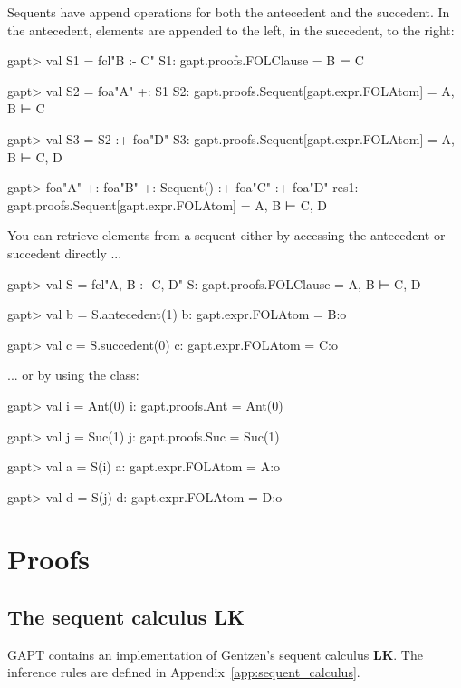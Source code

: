 \documentclass[a4paper,11pt]{book}
\newcommand{\LK}{\textbf{LK}}
\newcommand{\cli}[1]{{\ttfamily {#1}}}
\begin{document}
Sequents have append operations for both the antecedent and the succedent. In the antecedent,
elements are appended to the left, in the succedent, to the right:

\begin{clilisting}
gapt> val S1 = fcl"B :- C"
S1: gapt.proofs.FOLClause = B ⊢ C

gapt> val S2 = foa"A" +: S1
S2: gapt.proofs.Sequent[gapt.expr.FOLAtom] = A, B ⊢ C

gapt> val S3 = S2 :+ foa"D"
S3: gapt.proofs.Sequent[gapt.expr.FOLAtom] = A, B ⊢ C, D

gapt> foa"A" +: foa"B" +: Sequent() :+ foa"C" :+ foa"D"
res1: gapt.proofs.Sequent[gapt.expr.FOLAtom] = A, B ⊢ C, D

\end{clilisting}

You can retrieve elements from a sequent either by accessing the antecedent
or succedent directly ...
\begin{clilisting}
gapt> val S = fcl"A, B :- C, D"
S: gapt.proofs.FOLClause = A, B ⊢ C, D

gapt> val b = S.antecedent(1)
b: gapt.expr.FOLAtom = B:o

gapt> val c = S.succedent(0)
c: gapt.expr.FOLAtom = C:o

\end{clilisting}
... or by using the \cli{SequentIndex} class:

\begin{clilisting}
gapt> val i = Ant(0)
i: gapt.proofs.Ant = Ant(0)

gapt> val j = Suc(1)
j: gapt.proofs.Suc = Suc(1)

gapt> val a = S(i)
a: gapt.expr.FOLAtom = A:o

gapt> val d = S(j)
d: gapt.expr.FOLAtom = D:o

\end{clilisting}


\section{Proofs}\label{sec:entering_proofs}

\subsection{The sequent calculus LK}
GAPT contains an implementation of Gentzen's sequent calculus {\LK}.
The inference rules are defined in Appendix~\ref{app:sequent_calculus}.
\end{document}
